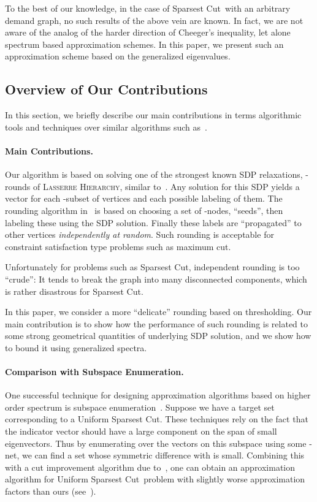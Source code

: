 \documentclass{article}
\newcommand{\usc}{\textsc{\sf Uniform Sparsest Cut}}
\newcommand{\nusc}{\textsc{\sf Non-Uniform Sparsest Cut}}
\newcommand{\lh}{\textsc{\sf Lasserre Hierarchy}}
\newcounter{alg-count}
\def\ngap{}
\renewcommand{\nusc}{{\sc Sparsest Cut}}
\renewcommand{\usc}{{\sc Uniform Sparsest Cut}}
\begin{document}
To the best of our knowledge, in the case of \nusc\ with an arbitrary
demand graph, no such results of the above vein are known.  In fact,
we are not aware of the analog of the harder direction of Cheeger's
inequality, let alone spectrum based approximation schemes. In this
paper, we present such an approximation scheme based on the
generalized eigenvalues. \ngap
\subsection{Overview of Our Contributions}
\label{sec:our-cont} \label{sec:intro-rse}
In this section, we briefly describe our main contributions in terms
algorithmic tools and techniques over similar algorithms such
as~\cite{gs11-qip}.

\medskip
\paragraph{Main Contributions.}
Our algorithm is based on solving one of the strongest known SDP
relaxations, -rounds of \lh, similar to~\cite{gs11-qip}.  Any
solution for this SDP yields a vector for each -subset of vertices
and each possible labeling of them.  The rounding algorithm
in~\cite{gs11-qip} is based on choosing a set of -nodes, ``seeds'',
then labeling these using the SDP solution. Finally these labels are
``propagated'' to other vertices {\em independently at random}.  Such
rounding is acceptable for constraint satisfaction type problems such
as maximum cut.

Unfortunately for problems such as \nusc, independent rounding is too
``crude'': It tends to break the graph into many disconnected
components, which is rather disastrous for \nusc.

In this paper, we consider a more ``delicate'' rounding based on
thresholding.  Our main contribution is to show how the performance of
such rounding is related to some strong geometrical quantities of
underlying SDP solution, and we show how to bound it using generalized
spectra.

\medskip
\paragraph{Comparison with Subspace Enumeration.} 
One successful technique for designing approximation algorithms based
on higher order spectrum is subspace enumeration~\cite{kolla10,ABS}.
Suppose we have a target set  corresponding to a \usc.  These
techniques rely on the fact that the indicator vector  should have
a large component on the span of small eigenvectors. Thus by
enumerating over the vectors on this subspace using some -net,
we can find a set whose symmetric difference with  is
small. Combining this with a cut improvement algorithm due
to~\cite{al08}, one can obtain an approximation algorithm for \usc\
problem with slightly worse approximation factors than ours
(see~).
\end{document}
